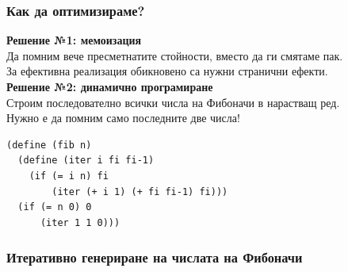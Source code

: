 \documentclass[alsotrans]{beamerswitch}
\begin{document}
\begin{frame}[fragile]
  \frametitle{Как да оптимизираме?}

  \textbf{Решение №1: мемоизация}\\
  Да помним вече пресметнатите стойности, вместо да ги смятаме пак.\\
  \pause
  \alert{За ефективна реализация обикновено са нужни странични ефекти.}\\[2ex]
  \pause
  \textbf{Решение №2: динамично програмиране}\\
  Строим последователно всички числа на Фибоначи в нарастващ ред.\\
  \pause
  \alert{Нужно е да помним само последните две числа!}\\
  \pause
\begin{lstlisting}
(define (fib n)
  (define (iter i fi fi-1)
    (if (= i n) fi
        (iter (+ i 1) (+ fi fi-1) fi)))
  (if (= n 0) 0
      (iter 1 1 0)))
\end{lstlisting}
\end{frame}

\begin{frame}
  \frametitle{Итеративно генериране на числата на Фибоначи}

  \small
  \begin{center}
  \end{center}
\end{frame}
\end{document}
